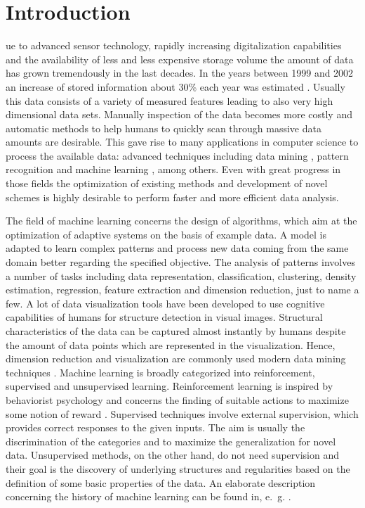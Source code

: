 \renewcommand{\publ}{}


\chapter{Introduction}

ue to advanced sensor technology, rapidly increasing digitalization capabilities and the availability of less and 
less expensive storage volume the amount of data has grown tremendously in the last decades. 
In the years between 1999 and 2002 an increase of stored information about 30\% each year was estimated \cite{Lyman2003}. 
Usually this data consists of a variety of measured features leading to also very high dimensional data sets. 
Manually inspection of the data becomes more costly and automatic methods to help humans to quickly scan through 
massive data amounts are desirable. 
This gave rise to many applications in computer science to process the available data: 
advanced techniques including data mining \cite{Han2005}, pattern recognition \cite{Duda2000} and machine learning 
\cite{Mitchell1997,Ripley1996,Bishop2007}, among others. 
Even with great progress in those fields the optimization of existing methods and development of novel schemes is highly 
desirable to perform faster and more efficient data analysis. 

The field of machine learning concerns the design of algorithms, 
which aim at the optimization of adaptive systems on the basis of example data. 
A model is adapted to learn complex patterns and process new data coming from the same domain better regarding the specified objective. 
The analysis of patterns involves a number of tasks including data representation, classification, clustering, density estimation, 
regression, feature extraction and dimension reduction, just to name a few. 
A lot of data visualization tools have been developed to use cognitive capabilities of humans for structure 
detection in visual images. 
Structural characteristics of the data can be captured almost instantly by humans despite the amount of data points which 
are represented in the visualization. 
Hence, dimension reduction and visualization are commonly used modern data mining techniques \cite{Lee2007}. 
Machine learning is broadly categorized into reinforcement, supervised and unsupervised learning. 
Reinforcement learning is inspired by behaviorist psychology and concerns the finding of suitable actions to maximize some notion 
of reward \cite{Sutton1998}. 
Supervised techniques involve external supervision, which provides correct responses to the given inputs. 
The aim is usually the discrimination of the categories and to maximize the generalization for novel data. 
Unsupervised methods, on the other hand, do not need supervision and their goal is the discovery of underlying structures 
and regularities based on the definition of some basic properties of the data.
An elaborate description concerning the history of machine learning can be found in, e.\ g. 
\cite{Bishop1995,Ripley1996,Mitchell1997,Duda2000,Bishop2007}. 

